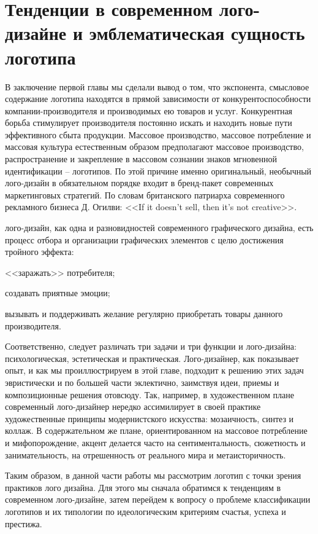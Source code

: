 \section{Тенденции в современном лого-дизайне и эмблематическая сущность логотипа}

В заключение первой главы мы сделали вывод о том, что экспонента, смысловое содержание логотипа
находятся в прямой зависимости от конкурентоспособности компании-производителя  и производимых ею
товаров и услуг.  Конкурентная борьба стимулирует производителя постоянно искать и находить новые
пути эффективного сбыта продукции. Массовое производство, массовое потребление и массовая культура
естественным образом предполагают массовое производство, распространение и закрепление в массовом
сознании знаков мгновенной идентификации -- логотипов. По этой причине именно оригинальный, необычный
лого-дизайн в обязательном порядке входит в бренд-пакет современных маркетинговых стратегий. По
словам британского патриарха современного рекламного бизнеса Д. Огилви: <<If it doesn’t sell, then
it’s not creative>>.

лого-дизайн, как одна и разновидностей современного графического дизайна, есть процесс отбора и
организации графических элементов с целю достижения тройного эффекта:
\begin{enumerate*}[label=\asbuk*)]
\item <<заражать>> потребителя;
\item создавать приятные эмоции;
\item вызывать и поддерживать желание регулярно приобретать товары данного производителя.
\end{enumerate*}

Соответственно, следует различать три задачи и три функции и лого-дизайна:
психологическая, эстетическая и практическая. Лого-дизайнер, как показывает опыт, и как мы
проиллюстрируем в этой главе, подходит к решению этих задач эвристически и по большей части
эклектично, заимствуя идеи, приемы и композиционные решения отовсюду. Так, например, в
художественном плане современный лого-дизайнер нередко ассимилирует в своей практике художественные
принципы модернистского искусства: мозаичность, синтез и коллаж. В содержательном же плане,
ориентированном на массовое потребление и мифопорождение, акцент делается часто на
сентиментальность, сюжетность и занимательность, на отрешенность от реального мира и
метаисторичность. \autocite{book:konradova}

Таким образом, в данной части работы мы рассмотрим логотип с точки зрения практиков лого
дизайна. Для этого мы сначала обратимся к тенденциям в современном лого-дизайне, затем перейдем к
вопросу о проблеме классификации логотипов и их типологии по идеологическим критериям счастья,
успеха и престижа.

